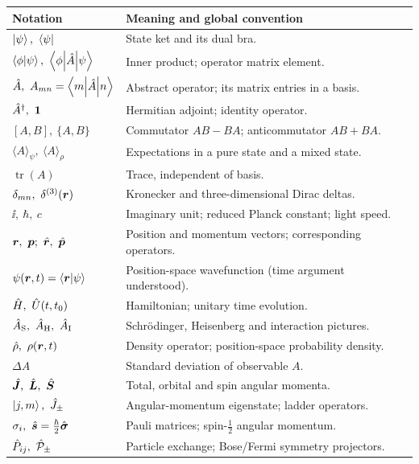 \renewcommand{\arraystretch}{1.10}
\setlength{\tabcolsep}{5pt}
\noindent\begin{tabular}{@{}>{\raggedright\arraybackslash}p{}>{\raggedright\arraybackslash}p{}@{}}
\toprule
\textbf{Notation} & \textbf{Meaning and global convention}\\
\midrule
$\ket\psi,\ \bra\psi$ & State ket and its dual bra.\\
$\left\langle\phi\middle|\psi\right\rangle,\ \left\langle\phi\middle|\hat{A}\middle|\psi\right\rangle$ & Inner product; operator matrix element.\\
$\op A,\ A_{mn}=\mel m{\op A}n$ & Abstract operator; its matrix entries in a basis.\\
$\op A^\dagger,\ \mathbf 1$ & Hermitian adjoint; identity operator.\\
$[A,B],\ \{A,B\}$ & Commutator $AB-BA$; anticommutator $AB+BA$.\\
$\langle A\rangle_\psi,\ \langle A\rangle_\rho$ & Expectations in a pure state and a mixed state.\\
$\operatorname{tr}(A)$ & Trace, independent of basis.\\
$\delta_{mn},\ \delta^{(3)}(\vect r)$ & Kronecker and three-dimensional Dirac deltas.\\
$\ii,\ \hbar,\ c$ & Imaginary unit; reduced Planck constant; light speed.\\
$\bm{r},\ \bm{p};\ \hat{\bm{r}},\ \hat{\bm{p}}$ & Position and momentum vectors; corresponding operators.\\
$\psi(\bm{r},t)=\left\langle\bm{r}\middle|\psi\right\rangle$ & Position-space wavefunction (time argument understood).\\
$\hat{H},\ \hat{U}(t,t_0)$ & Hamiltonian; unitary time evolution.\\
$\hat{A}_{\mathrm S},\ \hat{A}_{\mathrm H},\ \hat{A}_{\mathrm I}$ & Schr\"odinger, Heisenberg and interaction pictures.\\
$\op\rho,\ \rho(\vect r,t)$ & Density operator; position-space probability density.\\
$\Delta A$ & Standard deviation of observable $A$.\\
$\op{\vect J},\ \op{\vect L},\ \op{\vect S}$ & Total, orbital and spin angular momenta.\\
$\left|j,m\right\rangle,\ \hat{J}_\pm$ & Angular-momentum eigenstate; ladder operators.\\
$\sigma_i,\ \op{\vect s}=\frac\hbar2\op{\vect\sigma}$ & Pauli matrices; spin-$\frac12$ angular momentum.\\
$\op P_{ij},\ \op{\mathcal P}_\pm$ & Particle exchange; Bose/Fermi symmetry projectors.\\

\end{tabular}
